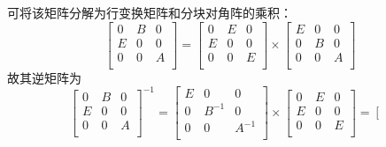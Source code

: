 \documentclass{article}
\begin{document}
\begin{enumerate}
    可将该矩阵分解为行变换矩阵和分块对角阵的乘积：
    \begin{equation*}
        \left[
            \begin{array}{ccc}
                0 & B & 0 \\
                E & 0 & 0 \\
                0 & 0 & A \\
            \end{array}
        \right]
        = 
        \left[
            \begin{array}{ccc}
                0 & E & 0 \\
                E & 0 & 0 \\
                0 & 0 & E \\
            \end{array}
        \right]
        \times
        \left[
            \begin{array}{ccc}
                E & 0 & 0 \\
                0 & B & 0 \\
                0 & 0 & A \\
            \end{array}
        \right]
    \end{equation*}
    故其逆矩阵为 
    \begin{equation*}
        \left[
            \begin{array}{ccc}
                0 & B & 0 \\
                E & 0 & 0 \\
                0 & 0 & A \\
            \end{array}
        \right]^{-1}
        =
        \left[
            \begin{array}{ccc}
                E & 0 & 0 \\
                0 & B^{-1} & 0 \\
                0 & 0 & A^{-1} \\
            \end{array}
        \right]
        \times
        \left[
            \begin{array}{ccc}
                0 & E & 0 \\
                E & 0 & 0 \\
                0 & 0 & E \\
            \end{array}
        \right]
        =
        \left[
            \begin{array}{ccc}

\end{array}
\end{equation*}
\end{enumerate}
\end{document}
